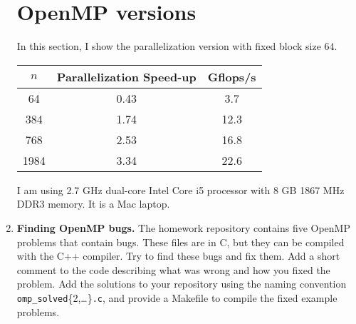 \documentclass[12pt]{article}
\begin{document}
\begin{enumerate}
\section{OpenMP versions}
In this section, I show the parallelization version with fixed block size $64$.

\begin{table}[ht]
\centering
\begin{tabular}{c|c|c}
$n$ & Parallelization Speed-up& Gflops/s\\[2 pt] \hline
64 & 0.43 & 3.7\\[2 pt]
384 & 1.74 & 12.3\\[2 pt]
768 & 2.53 & 16.8\\[2 pt]
1984 & 3.34 & 22.6
\end{tabular}
\end{table}

I am using 2.7 GHz dual-core Intel Core i5 processor
 with 8 GB 1867 MHz DDR3 memory. It is a Mac laptop.



\item {\bf Finding OpenMP bugs.}  The homework repository contains five
  OpenMP problems that contain bugs. These files are in C, but they
  can be compiled with the C++ compiler. Try to find these bugs and fix
  them. Add a short comment to the code describing what was wrong and
  how you fixed the problem. Add the solutions to your repository
  using the naming convention
  \texttt{omp\_solved}\{2,\ldots\}\texttt{.c}, and provide a Makefile
  to compile the fixed example problems.


\end{enumerate}
\end{document}
